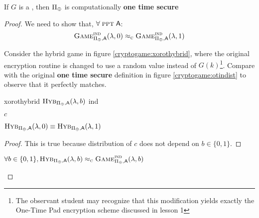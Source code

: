 \begin{theorem}
    If $G$ is a \prg, then $\Pi_{\oplus}$ is computationally \textbf{one time secure}
\end{theorem}

\begin{proof}
    We need to show that, $\forall\; \textsc{ppt}\; \textsf{A}$:
    \[
        \textsc{Game}_{\Pi_{\oplus}, \textsf{A}}^{\textsc{ind}}(\lambda, 0) \approx_\textsc{c} \textsc{Game}_{\Pi_{\oplus}, \textsf{A}}^{\textsc{ind}}(\lambda, 1)
    \]

    Consider the hybrid game in figure \ref{cryptogame:xorothybrid}, where the original encryption routine is changed to use a random value instead of $G(k)$\footnote{The observant student may recognize that this modification yields exactly the One-Time Pad encryption scheme discussed in lesson 1}. Compare with the original \textbf{one time secure} definition in figure \ref{cryptogame:otindist} to observe that it perfectly matches.

    \begin{cryptogame}
        {xorothybrid}
        {$\textsc{Hyb}_{\Pi_{\oplus}, \textsf{A}}(\lambda, b)$}
        {ind}


        {$c$}{}

        \seqdelay

        
    \end{cryptogame}

    \begin{lemma}
        \emph{\textrm{$\textsc{Hyb}_{\Pi_{\oplus}, \textsf{A}}(\lambda, 0) \equiv \textsc{Hyb}_{\Pi_{\oplus}, \textsf{A}}(\lambda, 1)$}}
    \end{lemma}

    \begin{proof}
    This is true because distribution of $c$ does not depend on $b \in \{0, 1\}$.
    \end{proof}

    \begin{lemma}
        $ \forall b \in \{0,1\}, \textsc{Hyb}_{\Pi_{\oplus}, \textsf{A}}(\lambda, b) \approx_\textsc{c} \textsc{Game}_{\Pi_{\oplus}, \textsf{A}}^{\textsc{ind}}(\lambda, b)$
    \end{lemma}


\end{proof}
